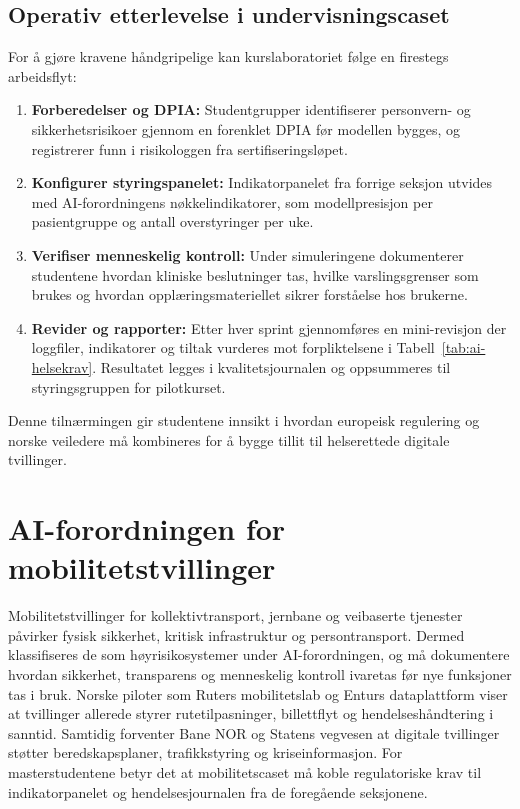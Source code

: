 \subsection{Operativ etterlevelse i undervisningscaset}
For å gjøre kravene håndgripelige kan kurslaboratoriet følge en firestegs arbeidsflyt:
\begin{enumerate}
    \item \textbf{Forberedelser og DPIA:} Studentgrupper identifiserer personvern- og sikkerhetsrisikoer gjennom en forenklet DPIA før modellen bygges, og registrerer funn i risikologgen fra sertifiseringsløpet.\citep{datatilsynet2023dpia}
    \item \textbf{Konfigurer styringspanelet:} Indikatorpanelet fra forrige seksjon utvides med AI-forordningens nøkkelindikatorer, som modellpresisjon per pasientgruppe og antall overstyringer per uke.
    \item \textbf{Verifiser menneskelig kontroll:} Under simuleringene dokumenterer studentene hvordan kliniske beslutninger tas, hvilke varslingsgrenser som brukes og hvordan opplæringsmateriellet sikrer forståelse hos brukerne.
    \item \textbf{Revider og rapporter:} Etter hver sprint gjennomføres en mini-revisjon der loggfiler, indikatorer og tiltak vurderes mot forpliktelsene i Tabell~\ref{tab:ai-helsekrav}. Resultatet legges i kvalitetsjournalen og oppsummeres til styringsgruppen for pilotkurset.
\end{enumerate}

Denne tilnærmingen gir studentene innsikt i hvordan europeisk regulering og norske veiledere må kombineres for å bygge tillit til helserettede digitale tvillinger.

\section{AI-forordningen for mobilitetstvillinger}
Mobilitetstvillinger for kollektivtransport, jernbane og veibaserte tjenester påvirker fysisk sikkerhet, kritisk infrastruktur og persontransport. Dermed klassifiseres de som høyrisikosystemer under AI-forordningen, og må dokumentere hvordan sikkerhet, transparens og menneskelig kontroll ivaretas før nye funksjoner tas i bruk.\citep{eu2024aiact} Norske piloter som Ruters mobilitetslab og Enturs dataplattform viser at tvillinger allerede styrer rutetilpasninger, billettflyt og hendelseshåndtering i sanntid.\citep{ruter2024mobilitetslab,entur2023dataplattform} Samtidig forventer Bane NOR og Statens vegvesen at digitale tvillinger støtter beredskapsplaner, trafikkstyring og kriseinformasjon.\citep{banenor2024digitalspor,vegvesen2023beredskap} For masterstudentene betyr det at mobilitetscaset må koble regulatoriske krav til indikatorpanelet og hendelsesjournalen fra de foregående seksjonene.

